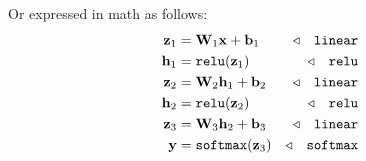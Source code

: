Or expressed in math as follows:
\begin{align}
    \mathbf{z}_1 &= \mathbf{W}_1\mathbf{x} + \mathbf{b}_1 &\triangleleft \quad \texttt{linear}\\
    \mathbf{h}_1 &= \texttt{relu}(\mathbf{z}_1) &\triangleleft \quad \texttt{relu}\\
    \mathbf{z}_2 &= \mathbf{W}_2\mathbf{h}_1 + \mathbf{b}_2 &\triangleleft \quad \texttt{linear}\\
    \mathbf{h}_2 &= \texttt{relu}(\mathbf{z}_2) &\triangleleft \quad \texttt{relu}\\
    \mathbf{z}_3 &= \mathbf{W}_3\mathbf{h}_2 + \mathbf{b}_3 &\triangleleft \quad \texttt{linear}\\
    \mathbf{y} &= \texttt{softmax}(\mathbf{z}_3) &\triangleleft \quad \text{\texttt{softmax}}
\end{align}




